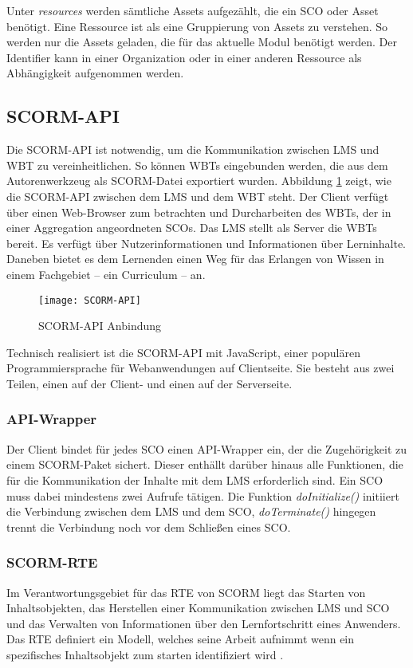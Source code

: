 Unter \textit{resources} werden sämtliche Assets aufgezählt, die ein SCO oder
Asset benötigt. Eine Ressource ist als eine Gruppierung von Assets zu
verstehen. So werden nur die Assets geladen, die für das aktuelle Modul
benötigt werden. Der Identifier kann in einer Organization oder in einer anderen
Ressource als Abhängigkeit aufgenommen werden.

\subsection{SCORM-API}
Die SCORM-API ist notwendig, um die Kommunikation zwischen LMS und WBT zu
vereinheitlichen. So können WBTs eingebunden werden, die aus dem Autorenwerkzeug
als SCORM-Datei exportiert wurden. Abbildung \ref{pic:scormApi} zeigt, wie die
SCORM-API zwischen dem LMS und dem WBT steht. Der Client verfügt über einen
Web-Browser zum betrachten und Durcharbeiten des WBTs, der in einer Aggregation
angeordneten SCOs. Das LMS stellt als Server die WBTs bereit. Es verfügt über
Nutzerinformationen und Informationen über Lerninhalte. Daneben bietet es dem
Lernenden einen Weg für das Erlangen von Wissen in einem Fachgebiet -- ein
Curriculum -- an.

\begin{figure}[ht]
\centering
\texttt{[image: SCORM-API]}
\caption{SCORM-API Anbindung\footnotemark}\label{pic:scormApi}
\end{figure}

Technisch realisiert ist die SCORM-API mit JavaScript, einer populären
Programmiersprache für Webanwendungen auf Clientseite. Sie besteht aus
zwei Teilen, einen auf der Client- und einen auf der Serverseite.

\subsubsection{API-Wrapper}
Der Client bindet für jedes SCO einen API-Wrapper ein, der die Zugehörigkeit zu
einem SCORM-Paket sichert. Dieser enthällt darüber hinaus alle Funktionen, die
für die Kommunikation der Inhalte mit dem LMS erforderlich sind.
Ein SCO muss dabei mindestens zwei Aufrufe tätigen. Die Funktion
\textit{doInitialize()} initiiert die Verbindung zwischen dem LMS und dem SCO,
\textit{doTerminate()} hingegen trennt die Verbindung noch vor dem Schließen
eines SCO.

\subsubsection{SCORM-RTE}
Im Verantwortungsgebiet für das \ac{RTE} von SCORM liegt das Starten von
Inhaltsobjekten, das Herstellen einer Kommunikation zwischen LMS und SCO und das
Verwalten von Informationen über den Lernfortschritt eines Anwenders. Das RTE
definiert ein Modell, welches seine Arbeit aufnimmt wenn ein spezifisches
Inhaltsobjekt zum starten identifiziert wird \cite{adl:2009}.

